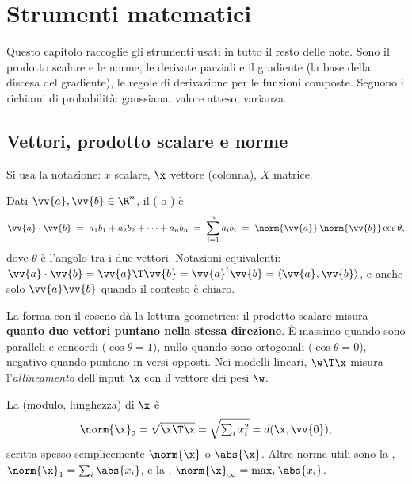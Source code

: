 \chapter{Strumenti matematici}
\label{cap:matematica}

\begin{inbreve}
Questo capitolo raccoglie gli strumenti usati in tutto il resto delle note. Sono il prodotto scalare e le norme,
le derivate parziali e il gradiente (la base della discesa del gradiente), le regole di derivazione per le
funzioni composte. Seguono i richiami di probabilità: gaussiana, valore atteso, varianza.
\end{inbreve}

\section{Vettori, prodotto scalare e norme}

Si usa la notazione: $x$ scalare, $\x$ vettore (colonna), $X$ matrice.

\begin{definizione}
Dati $\vv{a},\vv{b}\in\R^n$, il  ( o ) è
\begin{equation}
\vv{a}\cdot\vv{b} \;=\; a_1b_1 + a_2b_2 + \dots + a_nb_n \;=\; \sum_{i=1}^{n} a_i b_i \;=\; \norm{\vv{a}}\,\norm{\vv{b}}\cos\theta ,
\end{equation}
dove $\theta$ è l'angolo tra i due vettori. Notazioni equivalenti:
$\vv{a}\cdot\vv{b} = \vv{a}\T\vv{b} = \vv{a}^t\vv{b} = \langle\vv{a},\vv{b}\rangle$, e anche solo $\vv{a}\vv{b}$ quando il contesto è chiaro.
\end{definizione}

La forma con il coseno dà la lettura geometrica: il prodotto scalare misura \textbf{quanto due vettori puntano
nella stessa direzione}. È massimo quando sono paralleli e concordi ($\cos\theta = 1$), nullo quando sono
ortogonali ($\cos\theta=0$), negativo quando puntano in versi opposti. Nei modelli lineari, $\w\T\x$ misura
l'\emph{allineamento} dell'input $\x$ con il vettore dei pesi $\w$.

\begin{definizione}[Norme]
La  (modulo, lunghezza) di $\x$ è
\[
\norm{\x}_2 = \sqrt{\x\T\x} = \sqrt{\textstyle\sum_i x_i^2} = d(\x,\vv{0}),
\]
scritta spesso semplicemente $\norm{\x}$ o $\abs{\x}$. Altre norme utili sono la ,
$\norm{\x}_1 = \sum_i \abs{x_i}$, e la , $\norm{\x}_\infty = \max_i\abs{x_i}$.
\end{definizione}

